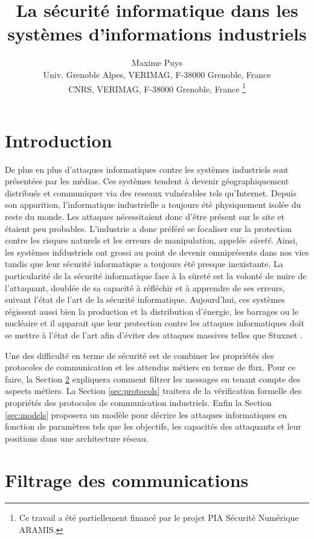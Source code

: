 \documentclass{article}
\title{La sécurité informatique dans les systèmes d'informations industriels}
\author{
    Maxime Puys\\
    Univ. Grenoble Alpes, VERIMAG, F-38000 Grenoble, France\\
    CNRS, VERIMAG, F-38000 Grenoble, France
    \thanks{Ce travail a été partiellement financé par le projet PIA Sécurité Numérique ARAMIS.}
}
\date{}
\begin{document}
\maketitle


\section{Introduction}

De plus en plus d'attaques informatiques contre les systèmes industriels sont
présentées par les médias.
Ces systèmes tendent à devenir géographiquement distribués et communiquer via
des reseaux vulnérables tels qu'Internet.
Depuis son apparition, l'informatique industrielle a toujours été physiquement
isolée du reste du monde.
Les attaques nécessitaient donc d'être présent sur le site et étaient peu
probables.
L'industrie a donc préféré se focaliser sur la protection contre les risques
naturels et les erreurs de manipulation, appelée {\em sûreté}.
Ainsi, les systèmes infdustriels ont grossi au point de devenir omniprésents
dans nos vies tandis que leur sécurité informatique a toujours été presque
inexistante.
La particularité de la sécurité informatique face à la sûreté est la volonté
de nuire de l'attaquant, doublée de sa capacité à réfléchir et à apprendre de
ses erreurs, suivant l'état de l'art de la sécurité informatique.
Aujourd'hui, ces systèmes régissent aussi bien la production et la distribution
d'énergie, les barrages ou le nucléaire et il apparait que leur protection
contre les attaques informatiques doit se mettre à l'état de l'art afin d'éviter
des attaques massives telles que Stuxnet \cite{Lan11}.

Une des difficulté en terme de sécurité est de combiner les propriétés des
protocoles de communication et les attendus métiers en terme de flux.
Pour ce faire, la Section \ref{sec:aramis} expliquera comment filtrer les
messages en tenant compte des aspects métiers.
La Section \ref{sec:protocols} traitera de la vérification formelle des
propriétés des protocoles de communication industriels.
Enfin la Section \ref{sec:models} proposera un modèle pour décrire les attaques
informatiques en fonction de paramètres tels que les objectifs, les capacités
des attaquants et leur positions dans une architecture réseau.

\section{Filtrage des communications}\label{sec:aramis}
\end{document}
